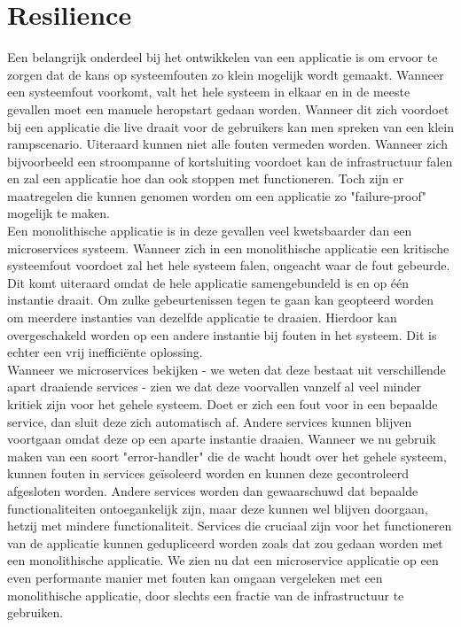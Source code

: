 \documentclass[pdftex,a4paper,12pt,twoside]{report}
\begin{document}
\section{Resilience}
\label{sec:resilience}

Een belangrijk onderdeel bij het ontwikkelen van een applicatie is om ervoor te zorgen dat de kans op systeemfouten zo klein mogelijk wordt gemaakt. Wanneer een systeemfout voorkomt, valt het hele systeem in elkaar en in de meeste gevallen moet een manuele heropstart gedaan worden. Wanneer dit zich voordoet bij een applicatie die live draait voor de gebruikers kan men spreken van een klein rampscenario. Uiteraard kunnen niet alle fouten vermeden worden. Wanneer zich bijvoorbeeld een stroompanne of kortsluiting voordoet kan de infrastructuur falen en zal een applicatie hoe dan ook stoppen met functioneren. Toch zijn er maatregelen die kunnen genomen worden om een applicatie zo "failure-proof" mogelijk te maken.
\\
Een monolithische applicatie is in deze gevallen veel kwetsbaarder dan een microservices systeem. Wanneer zich in een monolithische applicatie een kritische systeemfout voordoet zal het hele systeem falen, ongeacht waar de fout gebeurde. Dit komt uiteraard omdat de hele applicatie samengebundeld is en op één instantie draait. Om zulke gebeurtenissen tegen te gaan kan geopteerd worden om meerdere instanties van dezelfde applicatie te draaien. Hierdoor kan overgeschakeld worden op een andere instantie bij fouten in het systeem. Dit is echter een vrij inefficiënte oplossing.
\\
Wanneer we microservices bekijken - we weten dat deze bestaat uit verschillende apart draaiende services - zien we dat deze voorvallen vanzelf al veel minder kritiek zijn voor het gehele systeem. Doet er zich een fout voor in een bepaalde service, dan sluit deze zich automatisch af. Andere services kunnen blijven voortgaan omdat deze op een aparte instantie draaien. Wanneer we nu gebruik maken van een soort "error-handler" die de wacht houdt over het gehele systeem, kunnen fouten in services geïsoleerd worden en kunnen deze gecontroleerd afgesloten worden. Andere services worden dan gewaarschuwd dat bepaalde functionaliteiten ontoegankelijk zijn, maar deze kunnen wel blijven doorgaan, hetzij met mindere functionaliteit. Services die cruciaal zijn voor het functioneren van de applicatie kunnen gedupliceerd worden zoals dat zou gedaan worden met een monolithische applicatie. We zien nu dat een microservice applicatie op een even performante manier met fouten kan omgaan vergeleken met een monolithische applicatie, door slechts een fractie van de infrastructuur te gebruiken.
\end{document}

